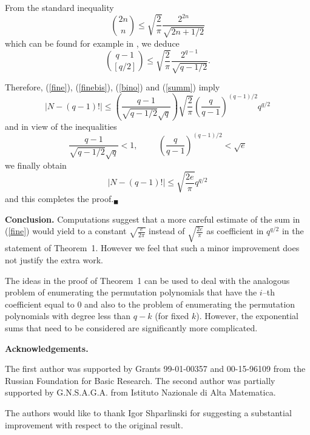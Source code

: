 \documentclass{amsart}
\begin{document}
{From} the standard inequality
$$\binom{2n}{n}\leq\sqrt{\frac{2}{\pi}}\frac{2^{2n}}{\sqrt{2n+1/2}}$$
which can be found for example in \cite{GR}, we deduce
\begin{equation}\label{summ}
\binom{q-1}{[q/2]}\leq\sqrt{\frac{2}{\pi}}\frac{2^{q-1}}{\sqrt{q-1/2}}.
\end{equation}

Therefore, (\ref{fine}), (\ref{finebis}), (\ref{bino})
and (\ref{summ}) imply
$$|N-(q-1)!|\leq \left(\frac{q-1}{\sqrt{q-1/2}\sqrt{q}}\right)
\sqrt{\frac{2}{\pi}}\left(\frac
q{q-1}\right)^{(q-1)/2}q^{q/2}$$
and in view of the inequalities
$$\frac{q-1}{\sqrt{q-1/2}\sqrt{q}}<1,\hspace{1cm}\left(\frac
q{q-1}\right)^{(q-1)/2}<\sqrt{e}$$
we finally obtain
$$\left|
N-(q-1)! \right|\leq
\sqrt{\frac{2e}{\pi}}{q^{q/2}}
$$
and this completes the proof.\hfill$_\blacksquare$\bigskip
\bigskip

\noindent\textbf{Conclusion.} Computations suggest that a more
careful estimate of the sum in (\ref{fine}) would yield to a
constant $\sqrt{\frac{e}{2\pi}}$ instead of $\sqrt{\frac{2e}{\pi}}$ as coefficient in $q^{q/2}$ in the statement of Theorem~1. However we feel
that such a minor improvement does not justify the extra work.

The ideas in the proof of Theorem~1 can be used to deal with the
analogous problem of enumerating the permutation polynomials that
have the $i$--th coefficient equal to $0$ and also to the problem
of enumerating the permutation polynomials with degree less than
$q-k$ (for fixed $k$). However, the exponential sums that need to
be considered are significantly more complicated.\bigskip\bigskip

\centerline{\textbf{Acknowledgements.}}

The first author was supported by Grants 99-01-00357
and 00-15-96109 from the Russian Foundation for Basic Research.
The second author was partially supported by G.N.S.A.G.A. from
Istituto Nazionale di Alta Matematica.\medskip

The authors would like to thank Igor Shparlinski
for suggesting a substantial improvement with respect to the original
result.\medskip
\end{document}
